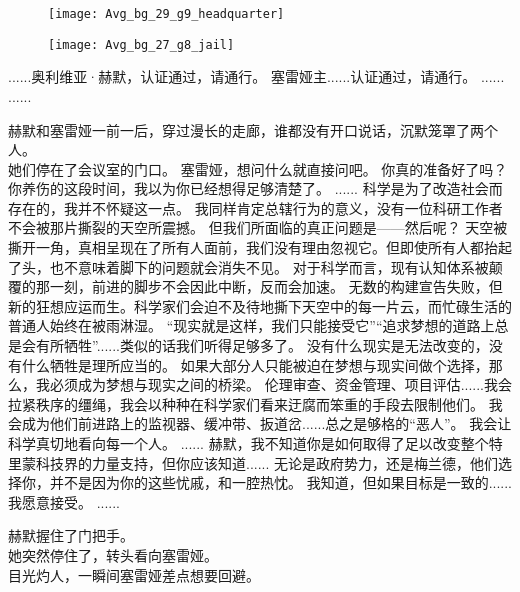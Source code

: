 \documentclass[openany]{book}
\begin{document}
\begin{figure}[h]
    \centering
    \texttt{[image: Avg\_bg\_29\_g9\_headquarter]}
\end{figure}
\begin{figure}[h]
    \centering
    \texttt{[image: Avg\_bg\_27\_g8\_jail]}
\end{figure}
\begin{dialogue}
     ......奥利维亚·赫默，认证通过，请通行。
     塞雷娅主......认证通过，请通行。
     ......
     ......\par
    赫默和塞雷娅一前一后，穿过漫长的走廊，谁都没有开口说话，沉默笼罩了两个人。\\
    她们停在了会议室的门口。
     塞雷娅，想问什么就直接问吧。
     你真的准备好了吗？
     你养伤的这段时间，我以为你已经想得足够清楚了。
     ......
     科学是为了改造社会而存在的，我并不怀疑这一点。
     我同样肯定总辖行为的意义，没有一位科研工作者不会被那片撕裂的天空所震撼。
     但我们所面临的真正问题是——然后呢？
     天空被撕开一角，真相呈现在了所有人面前，我们没有理由忽视它。但即使所有人都抬起了头，也不意味着脚下的问题就会消失不见。
     对于科学而言，现有认知体系被颠覆的那一刻，前进的脚步不会因此中断，反而会加速。
     无数的构建宣告失败，但新的狂想应运而生。科学家们会迫不及待地撕下天空中的每一片云，而忙碌生活的普通人始终在被雨淋湿。
     “现实就是这样，我们只能接受它”“追求梦想的道路上总是会有所牺牲”......类似的话我们听得足够多了。
     没有什么现实是无法改变的，没有什么牺牲是理所应当的。
     如果大部分人只能被迫在梦想与现实间做个选择，那么，我必须成为梦想与现实之间的桥梁。
     伦理审查、资金管理、项目评估......我会拉紧秩序的缰绳，我会以种种在科学家们看来迂腐而笨重的手段去限制他们。
     我会成为他们前进路上的监视器、缓冲带、扳道岔......总之是够格的“恶人”。
     我会让科学真切地看向每一个人。
     ......
     赫默，我不知道你是如何取得了足以改变整个特里蒙科技界的力量支持，但你应该知道......
     无论是政府势力，还是梅兰德，他们选择你，并不是因为你的这些忧戚，和一腔热忱。
     我知道，但如果目标是一致的......
     我愿意接受。
     ......\par
    赫默握住了门把手。\\
    她突然停住了，转头看向塞雷娅。\\
    目光灼人，一瞬间塞雷娅差点想要回避。

\end{dialogue}
\end{document}
